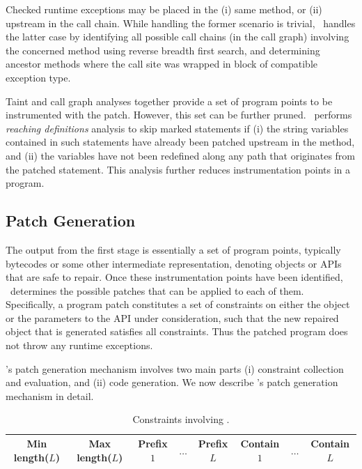 Checked runtime exceptions may be placed in the (i) same method, or (ii)
upstream in the call chain. While handling the former scenario is trivial,
\tool\ handles the latter case by identifying all possible call chains (in
the call graph) involving the concerned method using reverse breadth first
search, and determining ancestor methods where the call site was wrapped in
 block of compatible exception type.

 Taint and call graph analyses
together provide a set of program points to be instrumented with the
patch. However, this set can be further pruned. \tool\ performs \textit{reaching
definitions} analysis to skip marked statements if
(i) the string variables contained in such statements have already been patched
upstream in the method, and (ii) the variables have not been redefined along any
path that originates from the patched statement. This analysis further reduces
instrumentation points in a program.

\subsection{Patch Generation}
\label{sec:tool:stage2}

The output from the first stage is essentially a set of program points,
typically bytecodes or some other intermediate representation, denoting
 objects or APIs that are safe to repair. Once these
instrumentation points have been identified, \tool\ determines the
possible patches that can be applied to each of them. Specifically, a program
patch constitutes a set of constraints on either the  object or the
parameters to the  API under consideration, such that the new
repaired  object that is generated satisfies all constraints. Thus
the patched program does not throw any runtime exceptions.

\tool's patch generation mechanism involves two main parts (i) constraint
collection and evaluation, and (ii) code generation. We now describe \tool's
patch generation mechanism in detail. 


\begin{table}[t]
\centering
\caption{Constraints involving .}
\scriptsize
\setlength{\tabcolsep}{2.5pt}
\begin{tabular}{|c|c|c|c|c|c|c|c|}
\hline
Min length($L$) & Max length($L$) & Prefix $1$ & $\ldots$ & Prefix$L$ & Contain
$1$ & $\ldots$ & Contain $L$\\
\hline
\end{tabular}
\label{table:constraint}
\end{table}

